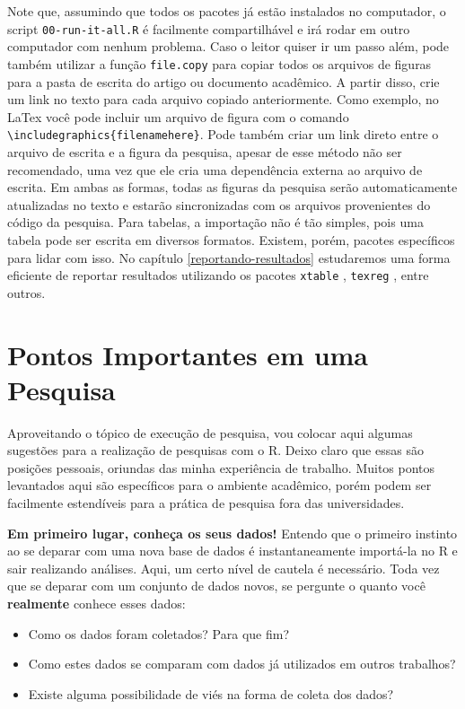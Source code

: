 \documentclass[
  11pt,
]{book}
\providecommand{\tightlist}{%
  \setlength{\itemsep}{0pt}\setlength{\parskip}{0pt}}
\begin{document}
Note que, assumindo que todos os pacotes já estão instalados no computador, o script \texttt{00-run-it-all.R} é facilmente compartilhável e irá rodar em outro computador com nenhum problema. Caso o leitor quiser ir um passo além, pode também utilizar a função \texttt{file.copy} para copiar todos os arquivos de figuras para a pasta de escrita do artigo ou documento acadêmico. A partir disso, crie um link no texto para cada arquivo copiado anteriormente. Como exemplo, no LaTex você pode incluir um arquivo de figura com o comando \texttt{\textbackslash{}includegraphics\{filenamehere\}}. Pode também criar um link direto entre o arquivo de escrita e a figura da pesquisa, apesar de esse método não ser recomendado, uma vez que ele cria uma dependência externa ao arquivo de escrita. Em ambas as formas, todas as figuras da pesquisa serão automaticamente atualizadas no texto e estarão sincronizadas com os arquivos provenientes do código da pesquisa. Para tabelas, a importação não é tão simples, pois uma tabela pode ser escrita em diversos formatos. Existem, porém, pacotes específicos para lidar com isso. No capítulo \ref{reportando-resultados} estudaremos uma forma eficiente de reportar resultados utilizando os pacotes \texttt{xtable} \citep{R-xtable}, \texttt{texreg} \citep{R-texreg}, entre outros.

\hypertarget{pontos-importantes-em-uma-pesquisa}{%
\section{Pontos Importantes em uma Pesquisa}\label{pontos-importantes-em-uma-pesquisa}}

Aproveitando o tópico de execução de pesquisa, vou colocar aqui algumas sugestões para a realização de pesquisas com o R. Deixo claro que essas são posições pessoais, oriundas das minha experiência de trabalho. Muitos pontos levantados aqui são específicos para o ambiente acadêmico, porém podem ser facilmente estendíveis para a prática de pesquisa fora das universidades.

\textbf{Em primeiro lugar, conheça os seus dados!} Entendo que o primeiro instinto ao se deparar com uma nova base de dados é instantaneamente importá-la no R e sair realizando análises. Aqui, um certo nível de cautela é necessário. Toda vez que se deparar com um conjunto de dados novos, se pergunte o quanto você \textbf{realmente} conhece esses dados:

\begin{itemize}
\tightlist
\item
  Como os dados foram coletados? Para que fim?
\item
  Como estes dados se comparam com dados já utilizados em outros trabalhos?
\item
  Existe alguma possibilidade de viés na forma de coleta dos dados?
\end{itemize}
\end{document}
